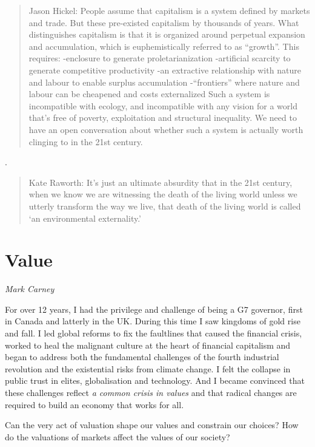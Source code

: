 \documentclass[
]{book}
\begin{document}
\begin{quote}
Jason Hickel: People assume that capitalism is a system
defined by markets and trade.
But these pre-existed capitalism by thousands of years.
What distinguishes capitalism is that it is organized around
perpetual expansion and accumulation,
which is euphemistically referred to as ``growth''.
This requires:
-enclosure to generate proletarianization
-artificial scarcity to generate competitive productivity
-an extractive relationship with nature and labour to enable surplus accumulation
-``frontiers'' where nature and labour can be cheapened and costs externalized
Such a system is incompatible with ecology, and incompatible with any vision
for a world that's free of poverty, exploitation and structural inequality.
We need to have an open conversation about whether such a system is actually
worth clinging to in the 21st century.
\end{quote}

.

\begin{quote}
Kate Raworth: It's just an ultimate absurdity that in the 21st century,
when we know we are witnessing the death of the living world
unless we utterly transform the way we live,
that death of the living world is called `an environmental externality.'
\end{quote}

\hypertarget{value}{%
\chapter{Value}\label{value}}

\emph{Mark Carney}

For over 12 years, I had the privilege and challenge of being a G7 governor, first in Canada and latterly in the UK. During this time I saw kingdoms of gold rise and fall. I led global reforms to fix the faultlines that caused the financial crisis, worked to heal the malignant culture at the heart of financial capitalism and began to address both the fundamental challenges of the fourth industrial revolution and the existential risks from climate change. I felt the collapse in public trust in elites, globalisation and technology. And I became convinced that these challenges reflect \emph{a common crisis in values} and that radical changes are required to build an economy that works for all.

Can the very act of valuation shape our values and constrain our choices? How do the valuations of markets affect the values of our society?
\end{document}
